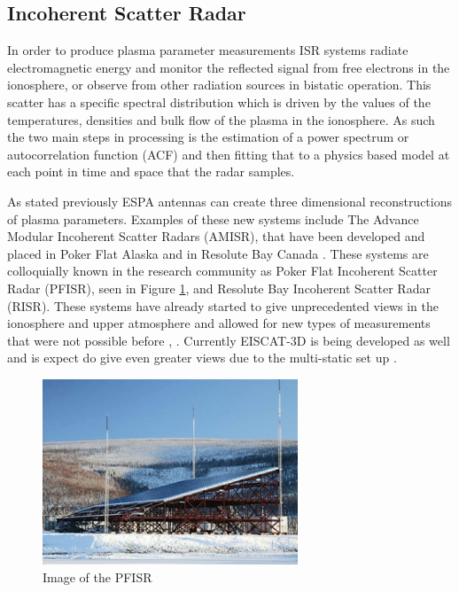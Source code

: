 \subsection{Incoherent Scatter Radar}

In order to produce plasma parameter measurements ISR systems radiate electromagnetic energy and monitor the reflected signal from free electrons in the ionosphere, or observe from other radiation sources in bistatic operation. This scatter has a specific spectral distribution which is driven by the values of the temperatures, densities and bulk flow of the plasma in the ionosphere. As such the two main steps in processing is the estimation of a power spectrum or autocorrelation function (ACF) and then fitting that to a physics based model at each point in time and space that the radar samples. 

As stated previously ESPA antennas can create three dimensional reconstructions of plasma parameters. Examples of these new systems include The Advance Modular Incoherent Scatter Radars (AMISR), that have been developed and placed in Poker Flat Alaska and in Resolute Bay Canada \cite{Semeter2009738}. These systems are colloquially known in the research community as Poker Flat Incoherent Scatter Radar (PFISR), seen in Figure \ref{fig:amisrpic}, and Resolute Bay Incoherent Scatter Radar (RISR). These systems have already started to give unprecedented views in the ionosphere and upper atmosphere and allowed for new types of measurements that were not possible before \cite{semeter2010CI} \cite{butler:imagingfregiondrifts}, \cite{Nicolls:2007ie}. Currently EISCAT-3D is being developed as well and is expect do give even greater views due to the multi-static set up \cite{eiscat3ddesign}.

\begin{figure}[!t]
\centering
\includegraphics[width=3in]{amisrimage}
\caption{Image of the PFISR \cite{SRIpage}}
\label{fig:amisrpic}
\end{figure}


